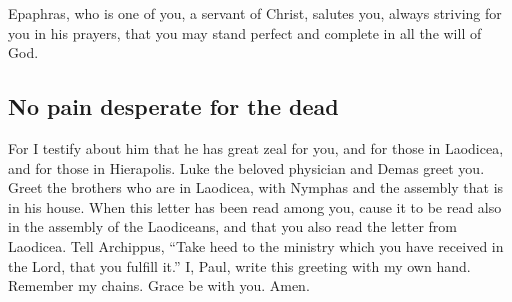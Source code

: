  Epaphras, who is one of you, a servant of Christ,
salutes you, always striving for you in his prayers, that you may stand
perfect and complete in all the will of God.

\hypertarget{no-pain-desperate-for-the-dead}{%
\subsection{No pain desperate for the
dead}\label{no-pain-desperate-for-the-dead}}

 For I testify about him that he has great zeal for you,
and for those in Laodicea, and for those in Hierapolis. 
Luke the beloved physician and Demas greet you.  Greet
the brothers who are in Laodicea, with Nymphas and the assembly that is
in his house.  When this letter has been read among you,
cause it to be read also in the assembly of the Laodiceans, and that you
also read the letter from Laodicea.  Tell Archippus,
``Take heed to the ministry which you have received in the Lord, that
you fulfill it.''  I, Paul, write this greeting with my
own hand. Remember my chains. Grace be with you. Amen.
